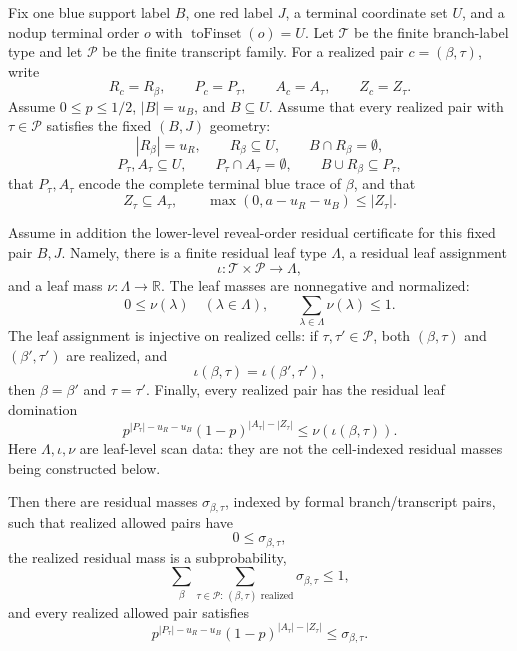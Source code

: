 \begin{helper}
Fix one blue support label \(B\), one red label \(J\), a terminal
coordinate set \(U\), and a nodup terminal order \(o\) with
\(\operatorname{toFinset}(o)=U\).  Let \(\mathcal T\) be the finite
branch-label type and let \(\mathcal P\) be the finite transcript family.
For a realized pair \(c=(\beta,\tau)\), write
\[
R_c=R_\beta,\qquad P_c=P_\tau,\qquad A_c=A_\tau,\qquad Z_c=Z_\tau .
\]
Assume \(0\le p\le1/2\), \(|B|=u_B\), and \(B\subseteq U\).  Assume that
every realized pair with \(\tau\in\mathcal P\) satisfies the fixed
\((B,J)\) geometry:
\[
|R_\beta|=u_R,\qquad R_\beta\subseteq U,\qquad B\cap R_\beta=\emptyset,
\]
\[
P_\tau,A_\tau\subseteq U,\qquad P_\tau\cap A_\tau=\emptyset,\qquad
B\cup R_\beta\subseteq P_\tau,
\]
that \(P_\tau,A_\tau\) encode the complete terminal blue trace of \(\beta\),
and that
\[
Z_\tau\subseteq A_\tau,\qquad
\max(0,a-u_R-u_B)\le |Z_\tau|.
\]

Assume in addition the lower-level reveal-order residual certificate for
this fixed pair \(B,J\).  Namely, there is a finite residual leaf type
\(\Lambda\), a residual leaf assignment
\[
\iota:\mathcal T\times\mathcal P\to\Lambda,
\]
and a leaf mass \(\nu:\Lambda\to\mathbb R\).  The leaf masses are
nonnegative and normalized:
\[
0\le \nu(\lambda)\quad(\lambda\in\Lambda),\qquad
\sum_{\lambda\in\Lambda}\nu(\lambda)\le1.
\]
The leaf assignment is injective on realized cells: if
\(\tau,\tau'\in\mathcal P\), both \((\beta,\tau)\) and
\((\beta',\tau')\) are realized, and
\[
\iota(\beta,\tau)=\iota(\beta',\tau'),
\]
then \(\beta=\beta'\) and \(\tau=\tau'\).  Finally, every realized pair has
the residual leaf domination
\[
p^{|P_\tau|-u_R-u_B}(1-p)^{|A_\tau|-|Z_\tau|}
  \le \nu(\iota(\beta,\tau)).
\]
Here \(\Lambda,\iota,\nu\) are leaf-level scan data: they are not the
cell-indexed residual masses being constructed below.

Then there are residual masses \(\sigma_{\beta,\tau}\), indexed by formal
branch/transcript pairs, such that realized allowed pairs have
\[
0\le\sigma_{\beta,\tau},
\]
the realized residual mass is a subprobability,
\[
\sum_{\beta}\sum_{\tau\in\mathcal P:\,(\beta,\tau)\text{ realized}}
  \sigma_{\beta,\tau}\le1,
\]
and every realized allowed pair satisfies
\[
p^{|P_\tau|-u_R-u_B}(1-p)^{|A_\tau|-|Z_\tau|}
  \le \sigma_{\beta,\tau}.
\]
\end{helper}
